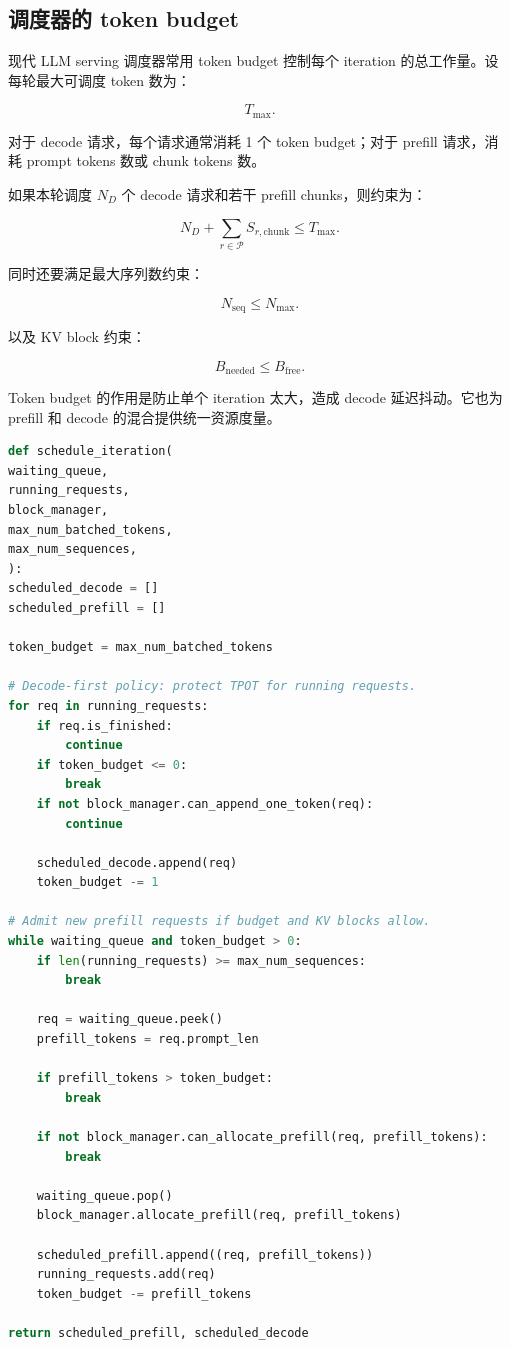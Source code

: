 \subsection{调度器的 token budget}
\label{subsec:scheduler-token-budget}

现代 LLM serving 调度器常用 token budget 控制每个 iteration 的总工作量。设每轮最大可调度 token 数为：

\[
T_{\max}.
\]

对于 decode 请求，每个请求通常消耗 1 个 token budget；对于 prefill 请求，消耗 prompt tokens 数或 chunk tokens 数。

如果本轮调度 $N_D$ 个 decode 请求和若干 prefill chunks，则约束为：

\[
N_D
+
\sum_{r\in\mathcal{P}}
S_{r,\mathrm{chunk}}
\le
T_{\max}.
\]

同时还要满足最大序列数约束：

\[
N_{\mathrm{seq}}
\le
N_{\max}.
\]

以及 KV block 约束：

\[
B_{\mathrm{needed}}
\le
B_{\mathrm{free}}.
\]

Token budget 的作用是防止单个 iteration 太大，造成 decode 延迟抖动。它也为 prefill 和 decode 的混合提供统一资源度量。

\begin{lstlisting}[language=Python,caption={基于 token budget 的 prefill/decode 混合调度骨架},label={lst:mixed-prefill-decode-scheduler}]
def schedule_iteration(
waiting_queue,
running_requests,
block_manager,
max_num_batched_tokens,
max_num_sequences,
):
scheduled_decode = []
scheduled_prefill = []

token_budget = max_num_batched_tokens

# Decode-first policy: protect TPOT for running requests.
for req in running_requests:
    if req.is_finished:
        continue
    if token_budget <= 0:
        break
    if not block_manager.can_append_one_token(req):
        continue

    scheduled_decode.append(req)
    token_budget -= 1

# Admit new prefill requests if budget and KV blocks allow.
while waiting_queue and token_budget > 0:
    if len(running_requests) >= max_num_sequences:
        break

    req = waiting_queue.peek()
    prefill_tokens = req.prompt_len

    if prefill_tokens > token_budget:
        break

    if not block_manager.can_allocate_prefill(req, prefill_tokens):
        break

    waiting_queue.pop()
    block_manager.allocate_prefill(req, prefill_tokens)

    scheduled_prefill.append((req, prefill_tokens))
    running_requests.add(req)
    token_budget -= prefill_tokens

return scheduled_prefill, scheduled_decode

\end{lstlisting}

